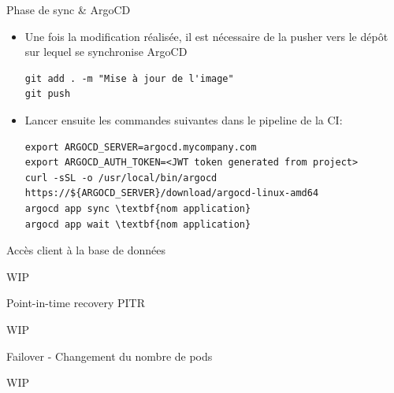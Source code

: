 
\begin{frame}[fragile]{Phase de sync \& ArgoCD}

\begin{itemize}
   \item Une fois la modification réalisée, il est nécessaire de la pusher vers le dépôt sur lequel se synchronise ArgoCD
\begin{tiny}
\begin{Verbatim}[commandchars=\&\{\}]
git add . -m "Mise à jour de l'image"
git push
\end{Verbatim}
\end{tiny}
   \item Lancer ensuite les commandes suivantes dans le pipeline de la CI:
\begin{tiny}
\begin{Verbatim}[commandchars=\\\{\}]
export ARGOCD_SERVER=argocd.mycompany.com
export ARGOCD_AUTH_TOKEN=<JWT token generated from project>
curl -sSL -o /usr/local/bin/argocd https://${ARGOCD_SERVER}/download/argocd-linux-amd64
argocd app sync \textbf{nom application}
argocd app wait \textbf{nom application}
\end{Verbatim}
\end{tiny}
\end{itemize}

\end{frame}


\begin{frame}[fragile]{Accès client à la base de données}

   WIP

\end{frame}


\begin{frame}[fragile]{Point-in-time recovery PITR}

   WIP

\end{frame}


\begin{frame}[fragile]{Failover - Changement du nombre de pods}

   WIP

\end{frame}

